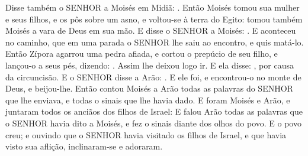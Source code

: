 {  Disse também o SENHOR a Moisés em Midiã: .
  Então Moisés tomou sua mulher e seus filhos, e os pôs sobre um asno, e voltou-se à terra do Egito: tomou também Moisés a vara de Deus em sua mão.
  E disse o SENHOR a Moisés: .
  E aconteceu no caminho, que em uma parada o SENHOR lhe saiu ao encontro, e quis matá-lo.
  Então Zípora agarrou uma pedra afiada, e cortou o prepúcio de seu filho, e lançou-o a seus pés, dizendo: .
  Assim lhe deixou logo ir. E ela disse: , por causa da circuncisão.
  E o SENHOR disse a Arão: . E ele foi, e encontrou-o no monte de Deus, e beijou-lhe.
  Então contou Moisés a Arão todas as palavras do SENHOR que lhe enviava, e todas o sinais que lhe havia dado.
  E foram Moisés e Arão, e juntaram todos os anciãos dos filhos de Israel:
  E falou Arão todas as palavras que o SENHOR havia dito a Moisés, e fez o sinais diante dos olhos do povo.
  E o povo creu; e ouvindo que o SENHOR havia visitado os filhos de Israel, e que havia visto sua aflição, inclinaram-se e adoraram.
\par }

